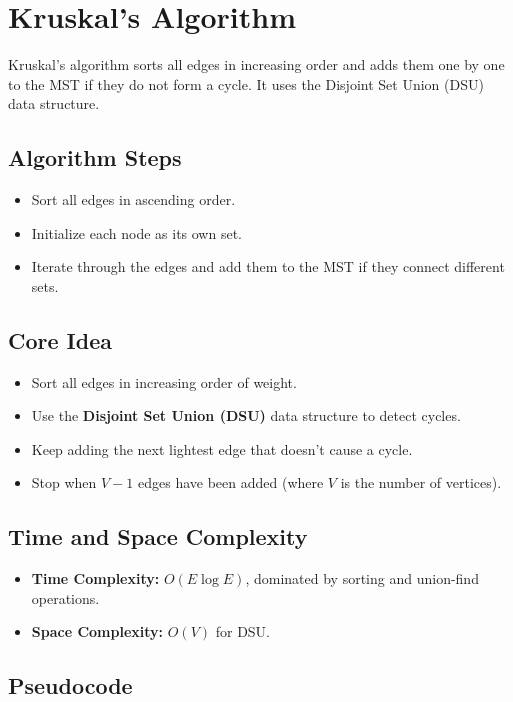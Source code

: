 \documentclass[14pt,a4paper]{extarticle}
\begin{document}
\section{Kruskal's Algorithm}

Kruskal's algorithm sorts all edges in increasing order and adds them one by one to the MST if 
they do not form a cycle. It uses the Disjoint Set Union (DSU) data structure.

\subsection{Algorithm Steps}
\begin{itemize}
    \item Sort all edges in ascending order.
    \item Initialize each node as its own set.
    \item Iterate through the edges and add them to the MST if they connect different sets.
\end{itemize}

\subsection{Core Idea}
\begin{itemize}
    \item Sort all edges in increasing order of weight.
    \item Use the \textbf{Disjoint Set Union (DSU)} data structure to detect cycles.
    \item Keep adding the next lightest edge that doesn't cause a cycle.
    \item Stop when \(V-1\) edges have been added (where \(V\) is the number of vertices).
\end{itemize}

\subsection*{Time and Space Complexity}
\begin{itemize}
    \item \textbf{Time Complexity:} \(O(E \log E)\), dominated by sorting and union-find operations.
    \item \textbf{Space Complexity:} \(O(V)\) for DSU.
\end{itemize}

\subsection{Pseudocode}
\end{document}
